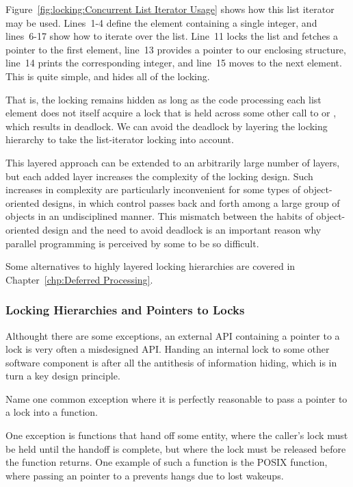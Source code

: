 Figure~\ref{fig:locking:Concurrent List Iterator Usage} shows how
this list iterator may be used.
Lines~1-4 define the  element containing a single integer,
and lines~6-17 show how to iterate over the list.
Line~11 locks the list and fetches a pointer to the first element,
line~13 provides a pointer to our enclosing  structure,
line~14 prints the corresponding integer, and
line~15 moves to the next element.
This is quite simple, and hides all of the locking.

That is, the locking remains hidden as long as the code processing each
list element does not itself acquire a lock that is held across some
other call to  or , which results in
deadlock.
We can avoid the deadlock by layering the locking hierarchy
to take the list-iterator locking into account.

This layered approach can be extended to an arbitrarily large number of layers,
but each added layer increases the complexity of the locking design.
Such increases in complexity are particularly inconvenient for some
types of object-oriented designs, in which control passes back and forth
among a large group of objects in an undisciplined manner.
This mismatch between the habits of object-oriented design and the
need to avoid deadlock is an important reason why parallel programming
is perceived by some to be so difficult.

Some alternatives to highly layered locking hierarchies are covered in
Chapter~\ref{chp:Deferred Processing}.

\subsubsection{Locking Hierarchies and Pointers to Locks}
\label{sec:locking:Locking Hierarchies and Pointers to Locks}

Althought there are some exceptions, an external API containing a pointer
to a lock is very often a misdesigned API.
Handing an internal lock to some other software component is after all
the antithesis of information hiding, which is in turn a key design
principle.

\QuickQuiz{}
	Name one common exception where it is perfectly reasonable
	to pass a pointer to a lock into a function.
 \QuickQuizEnd

One exception is functions that hand off some entity,
where the caller's lock must be held until the handoff is complete,
but where the lock must be released before the function returns.
One example of such a function is the POSIX 
function, where passing an pointer to a 
prevents hangs due to lost wakeups.

